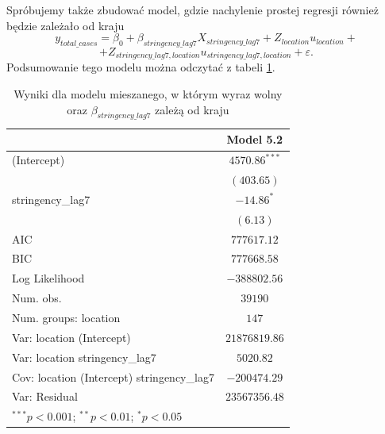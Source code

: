 \documentclass[12pt]{mwbk}
\theoremstyle{plain}
\theoremstyle{definition}
\theoremstyle{definition}
\begin{document}
\noindent Spróbujemy także zbudować model, gdzie nachylenie prostej regresji również będzie zależało od kraju
$$y_{total\_cases}=\beta_0+\beta_{stringency\_lag7} X_{stringency\_lag7}+Z_{location}u_{location}+$$$$+Z_{stringency\_lag7,location}u_{stringency\_lag7,location}+\varepsilon.$$
Podsumowanie tego modelu można odczytać z tabeli \ref{table:mod5-slope}.
\newpage
\begin{table}[!htpb]
	\begin{center}
		\begin{tabular}{l c}
			\hline
			& Model 5.2 \\
			\hline
			(Intercept)                                & $4570.86^{***}$ \\
			& $(403.65)$      \\
			stringency\_lag7                           & $-14.86^{*}$    \\
			& $(6.13)$        \\
			\hline
			AIC                                        & $777617.12$     \\
			BIC                                        & $777668.58$     \\
			Log Likelihood                             & $-388802.56$    \\
			Num. obs.                                  & $39190$         \\
			Num. groups: location                      & $147$           \\
			Var: location (Intercept)                  & $21876819.86$   \\
			Var: location stringency\_lag7             & $5020.82$       \\
			Cov: location (Intercept) stringency\_lag7 & $-200474.29$    \\
			Var: Residual                              & $23567356.48$   \\
			\hline
			\multicolumn{2}{l}{\scriptsize{$^{***}p<0.001$; $^{**}p<0.01$; $^{*}p<0.05$}}
		\end{tabular}
		\caption{Wyniki dla modelu mieszanego, w którym wyraz wolny oraz $\beta_{stringency\_lag7}$ zależą od kraju}
		\label{table:mod5-slope}
	\end{center}
\end{table}
\end{document}
